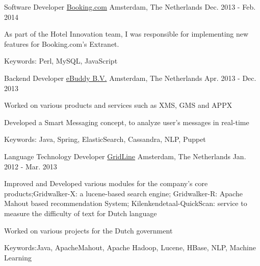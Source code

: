 \begin{cventries}
  \cventry
    {Software Developer} %
    {\href{https://www.booking.com/}{Booking.com}} %
    {Amsterdam, The Netherlands} %
    {Dec. 2013 - Feb. 2014} %
    {
      \begin{cvitems} %
        \item {As part of the Hotel Innovation team, I was responsible for implementing new features for Booking.com's Extranet.}
        \item {Keywords: Perl, MySQL, JavaScript}
      \end{cvitems}
    }

  \cventry
    {Backend Developer} %
    {\href{http://ebuddy.com/}{eBuddy B.V.}} %
    {Amsterdam, The Netherlands} %
    {Apr. 2013 - Dec. 2013} %
    {
      \begin{cvitems} %
        \item {Worked on various products and services such as XMS, GMS and APPX}
        \item {Developed a Smart Messaging concept, to analyze user's messages in real-time}
        \item {Keywords: Java, Spring, ElasticSearch, Cassandra, NLP, Puppet}
      \end{cvitems}
    }

  \cventry
    {Language Technology Developer} %
    {\href{http://gridline.nl}{GridLine}} %
    {Amsterdam, The Netherlands} %
    {Jan. 2012 - Mar. 2013} %
    {
      \begin{cvitems} %
        \item {Improved and Developed various modules for the company's core products;Gridwalker-X: a lucene-based search engine; Gridwalker-R: Apache Mahout based recommendation System; Kilenkendetaal-QuickScan: service to measure the difficulty of text for Dutch language}
        \item {Worked on various projects for the Dutch government}
        \item {Keywords:Java, ApacheMahout, Apache Hadoop, Lucene, HBase, NLP, Machine Learning}
      \end{cvitems}
    }


\end{cventries}
